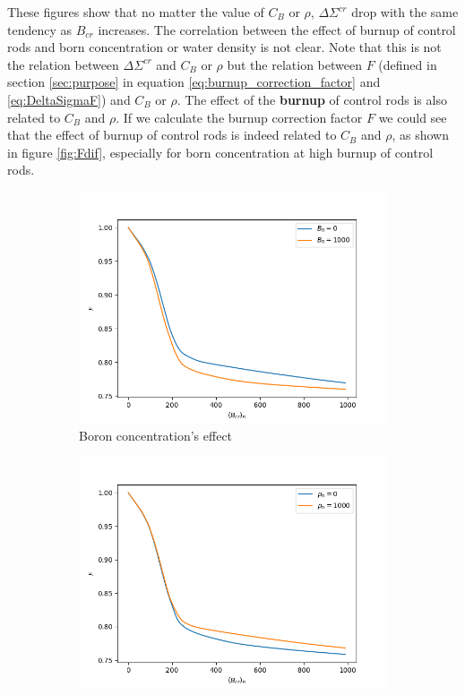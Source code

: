 These figures show that no matter the value of $C_B$ or $\rho$, $\Delta\Sigma^{cr}$ drop with the same
tendency as $B_{cr}$ increases.
The correlation between the effect of burnup of control rods and born concentration or water density is not clear.
Note that this is not the relation between $\Delta\Sigma^{cr}$ and $C_B$ or $\rho$ but the
relation between $F$ (defined in section \ref{sec:purpose} in equation \ref{eq:burnup_correction_factor} and \ref{eq:DeltaSigmaF})
and $C_B$ or $\rho$.
The effect of the \textbf{burnup} of control rods is also related to $C_B$ and $\rho$.
If we calculate the burnup correction factor $F$
we could see that the effect of burnup of control rods is indeed related to $C_B$ and $\rho$,
as shown in figure \ref{fig:Fdif},
especially for born concentration at high burnup of control rods.
\begin{figure}[!htb]
    \centering
    \begin{subfigure}[b]{.475\textwidth}
        \centering
        \includegraphics[width=\textwidth]{Figs/F_Bcr_difB.png}
        \caption{Boron concentration's effect}
        \label{fig:FdiffB}
    \end{subfigure}%
    \hfill
    \begin{subfigure}[b]{.475\textwidth}
        \centering
        \includegraphics[width=\textwidth]{Figs/F_Bcr_difwd.png}

\end{subfigure}
\end{figure}
